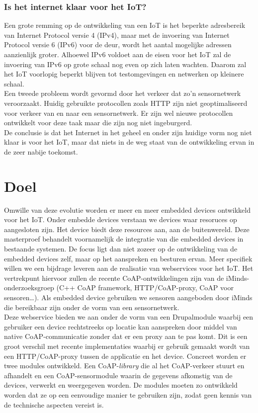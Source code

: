 \subsubsection{Is het internet klaar voor het IoT?}
Een grote remming op de ontwikkeling van een IoT is het beperkte adresbereik van Internet Protocol versie 4 (IPv4), maar met de invoering van Internet Protocol versie 6 (IPv6) voor de deur, wordt het aantal mogelijke adressen aanzienlijk groter.
Alhoewel IPv6 voldoet aan de eisen voor het IoT zal de invoering van IPv6 op grote schaal nog even op zich laten wachten. Daarom zal het IoT voorlopig beperkt blijven tot testomgevingen en netwerken op kleinere schaal.\\
Een tweede probleem wordt gevormd door het verkeer dat zo'n sensornetwerk veroorzaakt. Huidig gebruikte protocollen zoals HTTP zijn niet geoptimaliseerd voor verkeer van en naar een sensornetwerk. Er zijn wel nieuwe protocollen ontwikkelt voor deze taak maar die zijn nog niet ingeburgerd.\\
De conclusie is dat het Internet in het geheel en onder zijn huidige vorm nog niet klaar is voor het IoT, maar dat niets in de weg staat van de ontwikkeling ervan in de zeer nabije toekomst.

\section{Doel}

Omwille van deze evolutie worden er meer en meer embedded devices ontwikkeld voor het IoT. Onder embedde devices verstaan we devices waar resoruces op aangesloten zijn. Het device biedt deze resources aan, aan de buitenwereld. Deze masterproef behandelt voornamelijk de integratie van die embedded devices in bestaande systemen. De focus ligt dan niet zozeer op de ontwikkeling van de embedded devices zelf, maar op het aanspreken en besturen ervan. Meer specifiek willen we een bijdrage leveren aan de realisatie van webservices voor het IoT. Het vertrekpunt hiervoor zullen de recente CoAP-ontwikkelingen zijn van de iMinds-onderzoeksgroep (C++ CoAP framework, HTTP/CoAP-proxy, CoAP voor sensoren…). Als embedded device gebruiken we sensoren aangeboden door iMinds die bereikbaar zijn onder de vorm van een sensornetwerk.\\

Deze webservice bieden we aan onder de vorm van een Drupalmodule waarbij een gebruiker een device rechtstreeks op locatie kan aanspreken door middel van native CoAP-communicatie zonder dat er een proxy aan te pas komt. Dit is een groot verschil met recente implementaties waarbij er gebruik gemaakt wordt van een HTTP/CoAP-proxy tussen de applicatie en het device. Concreet worden er twee modules ontwikkeld. Een CoAP-\textit{library} die al het CoAP-verkeer stuurt en afhandelt en een CoAP-sensormodule waarin de gegevens afkomstig van de devices, verwerkt en weergegeven worden. De modules moeten zo ontwikkeld worden dat ze op een eenvoudige manier te gebruiken zijn, zodat geen kennis van de technische aspecten vereist is.

